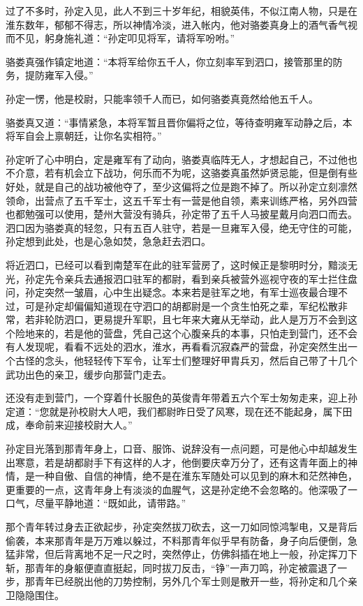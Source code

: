 过了不多时，孙定入见，此人不到三十岁年纪，相貌英伟，不似江南人物，只是在淮东数年，郁郁不得志，所以神情冷淡，进入帐内，他对骆娄真身上的酒气香气视而不见，躬身施礼道：“孙定叩见将军，请将军吩咐。”

骆娄真强作镇定地道：“本将军给你五千人，你立刻率军到泗口，接管那里的防务，提防雍军入侵。”

孙定一愣，他是校尉，只能率领千人而已，如何骆娄真竟然给他五千人。

骆娄真又道：“事情紧急，本将军暂且晋你偏将之位，等待查明雍军动静之后，本将军自会上禀朝廷，让你名实相符。”

孙定听了心中明白，定是雍军有了动向，骆娄真临阵无人，才想起自己，不过他也不介意，若有机会立下战功，何乐而不为呢，这骆娄真虽然妒贤忌能，但是倒有些好处，就是自己的战功被他夺了，至少这偏将之位是跑不掉了。所以孙定立刻凛然领命，出营点了五千军士，这五千军士有一营是他自领，素来训练严格，另外四营也都勉强可以使用，楚州大营没有骑兵，孙定带了五千人马披星戴月向泗口而去。泗口因为骆娄真的轻忽，只有五百人驻守，若是一旦雍军入侵，绝无守住的可能，孙定想到此处，也是心急如焚，急急赶去泗口。

将近泗口，已经可以看到南楚军在此的驻军营房了，这时候正是黎明时分，黯淡无光，孙定先令亲兵去通报泗口驻军的都尉，看到亲兵被营外巡视守夜的军士拦住盘问，孙定突然一皱眉，心中生出疑念。本来若是驻军之地，有军士巡夜最合理不过，可是孙定却偏偏知道现在守泗口的胡都尉是一个贪生怕死之辈，军纪松散非常，若非轮防泗口，更易提升军职，且七年来大雍从无举动，此人是万万不会到这个险地来的，若是他的营盘，凭自己这个心腹亲兵的本事，只怕走到营门，还不会有人发现呢，看看不远处的泗水，淮水，再看看沉寂森严的营盘，孙定突然生出一个古怪的念头，他轻轻传下军令，让军士们整理好甲胄兵刃，然后自己带了十几个武功出色的亲卫，缓步向那营门走去。

还没有走到营门，一个穿着什长服色的英俊青年带着五六个军士匆匆走来，迎上孙定道：“您就是孙校尉大人吧，我们都尉昨日受了风寒，现在还不能起身，属下田成，奉命前来迎接校尉大人。”

孙定目光落到那青年身上，口音、服饰、说辞没有一点问题，可是他心中却越发生出寒意，若是胡都尉手下有这样的人才，他倒要庆幸万分了，还有这青年面上的神情，是一种自傲、自信的神情，绝不是在淮东军随处可以见到的麻木和茫然神色，更重要的一点，这青年身上有淡淡的血腥气，这是孙定绝不会忽略的。他深吸了一口气，尽量平静地道：“既如此，请带路。”

那个青年转过身去正欲起步，孙定突然拔刀砍去，这一刀如同惊鸿掣电，又是背后偷袭，本来那青年是万万难以躲过，不料那青年似乎早有防备，身子向后便倒，急猛非常，但后背离地不足一尺之时，突然停止，仿佛斜插在地上一般，孙定挥刀下斩，那青年的身躯便直直挺起，同时拔刀反击，“铮”一声刀鸣，孙定被震退了一步，那青年已经脱出他的刀势控制，另外几个军士则是散开一些，将孙定和几个亲卫隐隐围住。

